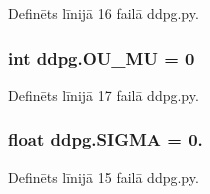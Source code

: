 Definēts līnijā 16 failā ddpg.\+py.

\subsubsection[{\texorpdfstring{O\+U\+\_\+\+MU}{OU_MU}}]{\setlength{\rightskip}{0pt plus 5cm}int ddpg.\+O\+U\+\_\+\+MU = 0}\hypertarget{namespaceddpg_a53de24d0b96144658853500fe6fbfb5e}{}\label{namespaceddpg_a53de24d0b96144658853500fe6fbfb5e}


Definēts līnijā 17 failā ddpg.\+py.

\subsubsection[{\texorpdfstring{S\+I\+G\+MA}{SIGMA}}]{\setlength{\rightskip}{0pt plus 5cm}float ddpg.\+S\+I\+G\+MA = 0.}\hypertarget{namespaceddpg_ad1dc6fdac61935bbb2a7b9772456659e}{}\label{namespaceddpg_ad1dc6fdac61935bbb2a7b9772456659e}


Definēts līnijā 15 failā ddpg.\+py.

